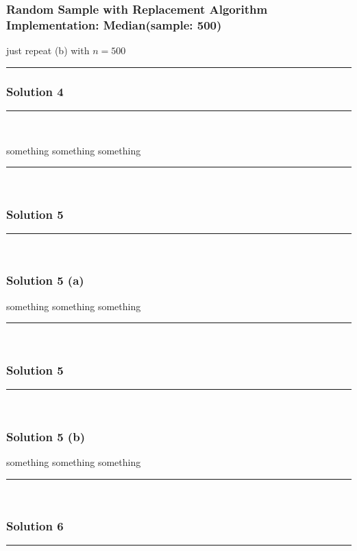 \documentclass{article}
\begin{document}
\subsubsection*{Random Sample with Replacement Algorithm Implementation: Median(sample: 500)}
\parbox{\textwidth}{
just repeat (b) with $n = 500$
}
\noindent\rule{\textwidth}{0.4pt}

\newpage

\subsubsection*{Solution 4}
\noindent\rule{\textwidth}{0.4pt}\\
\parbox{\textwidth}{
something something something
}
\noindent\rule{\textwidth}{0.4pt}\\

\newpage

\subsubsection*{Solution 5}
\noindent\rule{\textwidth}{0.4pt}\\
\subsubsection*{Solution 5 (a)}
\parbox{\textwidth}{
something something something
}
\noindent\rule{\textwidth}{0.4pt}\\

\newpage

\subsubsection*{Solution 5}
\noindent\rule{\textwidth}{0.4pt}\\
\subsubsection*{Solution 5 (b)}
\parbox{\textwidth}{
something something something
}
\noindent\rule{\textwidth}{0.4pt}\\

\newpage

\subsubsection*{Solution 6}
\noindent\rule{\textwidth}{0.4pt}\\
\end{document}
